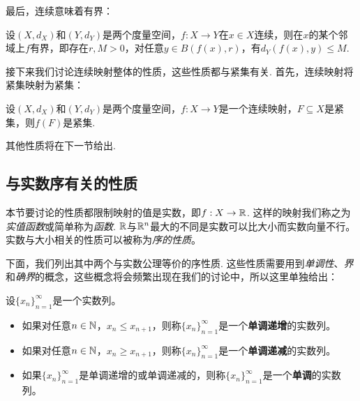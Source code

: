 最后，连续意味着有界：
\begin{proposition}\label{prop:continuous-bounded}
    设$(X,d_X)$和$(Y,d_Y)$是两个度量空间，$f:X\to Y$在$x\in X$连续，则在$x$的某个邻域上$f$有界，即存在$r,M>0$，对任意$y\in B(f(x),r)$，有$d_Y(f(x),y)\leq M$. 
\end{proposition}

接下来我们讨论连续映射整体的性质，这些性质都与紧集有关. 首先，连续映射将紧集映射为紧集：

\begin{proposition}\label{prop:continuous-compact}
    设$(X,d_X)$和$(Y,d_Y)$是两个度量空间，$f:X\to Y$是一个连续映射，$F\subseteq X$是紧集，则$f(F)$是紧集. 
\end{proposition}

其他性质将在下一节给出. 

\subsection{与实数序有关的性质}

本节要讨论的性质都限制映射的值是实数，即$f:X\to \mathbb{R}$. 这样的映射我们称之为\emph{实值函数}或简单称为\emph{函数}. $\mathbb{R}$与$\mathbb{R}^n$最大的不同是实数可以比大小而实数向量不行。实数与大小相关的性质可以被称为\emph{序的性质}。

下面，我们列出其中两个与实数公理等价的序性质. 这些性质需要用到\emph{单调性}、\emph{界}和\emph{确界}的概念，这些概念将会频繁出现在我们的讨论中，所以这里单独给出：

\begin{definition}[单调性]
    设$\{x_n\}_{n=1}^\infty$是一个实数列。
\begin{itemize}
    \item 如果对任意$n\in\mathbb{N}$，$x_n\leq x_{n+1}$，则称$\{x_n\}_{n=1}^\infty$是一个\textbf{单调递增}的实数列。
    \item 如果对任意$n\in\mathbb{N}$，$x_n\geq x_{n+1}$，则称$\{x_n\}_{n=1}^\infty$是一个\textbf{单调递减}的实数列。
    \item 如果$\{x_n\}_{n=1}^\infty$是单调递增的或单调递减的，则称$\{x_n\}_{n=1}^\infty$是一个\textbf{单调}的实数列。
\end{itemize}
\end{definition}

